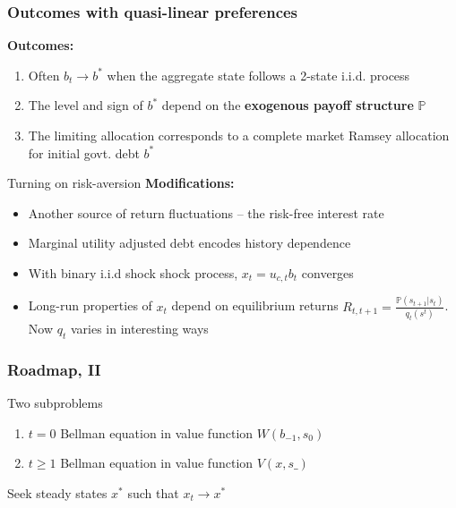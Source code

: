 \documentclass{beamer}
\begin{document}
\begin{frame}
 \frametitle{Outcomes with quasi-linear preferences}
 \textbf{Outcomes:}
 \begin{enumerate}
  \item  Often $b_t\to b^*$ when the aggregate state follows a 2-state i.i.d. process
  \item The level  and sign of $b^*$ depend on the \textbf{exogenous payoff structure} $\mathbb{P}$
  \item The limiting allocation corresponds to a complete market Ramsey allocation for initial govt. debt $b^*$
 \end{enumerate}

 \end{frame}



 \begin{frame}{Turning on risk-aversion}
  \textbf{Modifications:}
  \begin{itemize}
  \item Another source of return fluctuations -- the risk-free interest rate
   \item Marginal utility adjusted debt  encodes history dependence
   \item  With binary i.i.d shock shock process,  $x_t=u_{c,t}b_{t}$  converges

   \item Long-run properties of $x_t$ depend on equilibrium returns $R_{t,t+1}=\frac{\mathbb{P}(s_{t+1}|s_t)}{q_t(s^t)}$.
   Now $q_t$ varies in interesting ways


  \end{itemize}
  \end{frame}
%


\begin{frame}
\frametitle{Roadmap, II}


 Two subproblems
\begin{enumerate}
 \item  $t=0$ Bellman equation in value function $W(b_{-1},s_0)$ %
 \item  $t\geq 1$ Bellman equation in value function $V(x,s\_)$
\end{enumerate}

Seek steady states $x^*$ such that $x_t \to x^*$

\end{frame}
\end{document}
